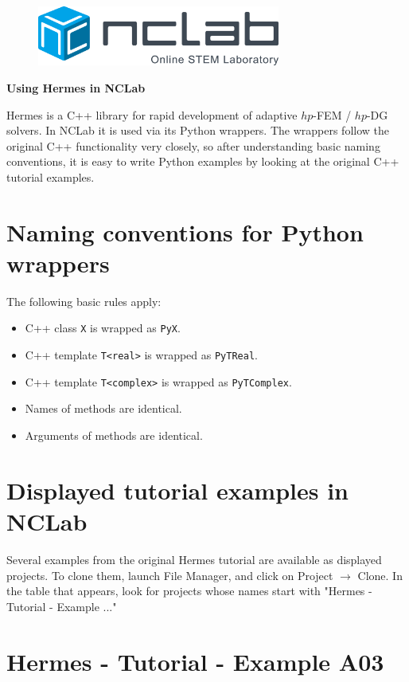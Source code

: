 \documentclass{article}
\begin{document}
\large

\vbox{}
\begin{figure}[!ht]
\includegraphics[width=8cm]{logo.png}
\vspace{4mm}
\end{figure}

\centerline{\huge \bf Using Hermes in NCLab}
\vspace{6mm}
\noindent
Hermes is a C++ library for rapid development of adaptive $hp$-FEM / $hp$-DG solvers.
In NCLab it is used via its Python wrappers. The wrappers follow the original C++ 
functionality very closely, so after understanding basic naming conventions, it
is easy to write Python examples by looking at the original C++ tutorial examples.

\section*{Naming conventions for Python wrappers}

The following basic rules apply:

\begin{itemize}
\item C++ class {\tt X} is wrapped as {\tt PyX}. 
\item C++ template {\tt T<real>} is wrapped as {\tt PyTReal}.  
\item C++ template {\tt T<complex>} is wrapped as {\tt PyTComplex}.  
\item Names of methods are identical. 
\item Arguments of methods are identical. 
\end{itemize}

\section*{Displayed tutorial examples in NCLab}

Several examples from the original Hermes tutorial are
available as displayed projects. To clone them, launch
File Manager, and click on Project $\rightarrow$ Clone.
In the table that appears, look for projects whose names 
start with "Hermes - Tutorial - Example ..."

\section*{Hermes - Tutorial - Example A03}
\end{document}

